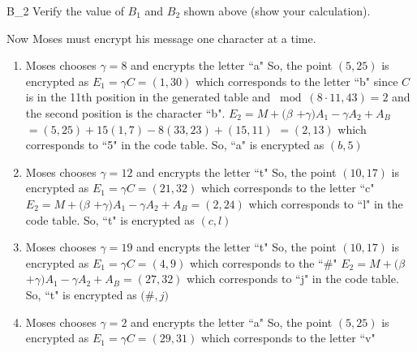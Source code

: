 \begin{example}{26}
\begin{exercise}{B_2} Verify the value of $B_1$ and $B_2$ shown above (show your calculation).
\end{exercise}
\begin{flushleft}
Now Moses must encrypt his message one character at a time.
\end{flushleft}
\begin{enumerate}[(1)] 
\item Moses chooses $\gamma$$ = 8$ and encrypts the letter ``a" \newline
	So, the point $(5, 25)$ is encrypted as\newline
	$E_1 = $$\gamma$$C = (1, 30)$ which corresponds to the letter ``b" since $C$ is in the 11th position in the generated table and $\bmod(8 \cdot 11,43) = 2$ and the second position is the character ``b". \newline
	$E_2 = M +($$\beta$ $+$$\gamma$$)$$A_1 -$$\gamma$$A_2 + A_B$ \newline
	$= (5, 25) + 15(1, 7) - 8(33, 23) + (15, 11)$ \newline
	$ = (2, 13)$ which corresponds to ``5" in the code table.  So, ``a" is encrypted as $(b, 5)$
\item Moses chooses $\gamma$$ = 12$ and encrypts the letter ``t" \newline
	So, the point $(10, 17)$ is encrypted as\newline
	$E_1 = $$\gamma$$C = (21, 32)$ which corresponds to the letter ``c"\newline
	$E_2 = M +($$\beta$ $+$$\gamma$$)$$A_1 -$$\gamma$$A_2 + A_B = (2, 24)$ which corresponds to ``l" in the code table.  So, ``t" is encrypted as $(c, l)$
\item Moses chooses $\gamma$$ = 19$ and encrypts the letter ``t" \newline
	So, the point $(10, 17)$ is encrypted as\newline
	$E_1 = $$\gamma$$C = (4, 9)$ which corresponds to the ``$\#$"\newline
	$E_2 = M +($$\beta$ $+$$\gamma$$)$$A_1 -$$\gamma$$A_2 + A_B = (27, 32)$ which corresponds to ``j" in the code table.  So, ``t" is encrypted as $($$\#$$, j)$
\item Moses chooses $\gamma$$ = 2$ and encrypts the letter ``a" \newline
	So, the point $(5, 25)$ is encrypted as\newline
	$E_1 = $$\gamma$$C = (29, 31)$ which corresponds to the letter ``v"\newline

\end{enumerate}
\end{example}
